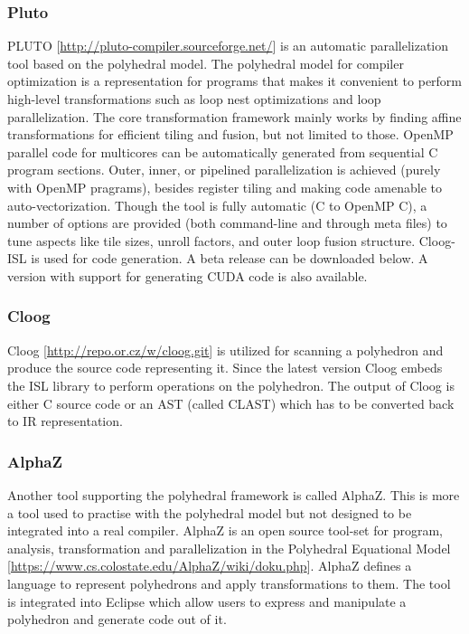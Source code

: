 \subsubsection{Pluto} 
PLUTO [\url{http://pluto-compiler.sourceforge.net/}] is an automatic parallelization tool based on the
polyhedral model. The polyhedral model for compiler optimization is a
representation for programs that makes it convenient to perform high-level
transformations such as loop nest optimizations and loop parallelization. 
The core transformation framework mainly works by
finding affine transformations for efficient tiling and fusion, but not limited
to those. OpenMP parallel code for multicores can be automatically generated
from sequential C program sections. Outer, inner, or pipelined parallelization
is achieved (purely with OpenMP pragrams), besides register tiling and making
code amenable to auto-vectorization. Though the tool is fully automatic (C to
OpenMP C), a number of options are provided (both command-line and
through meta files) to tune aspects like tile sizes, unroll factors,
and outer loop fusion structure. Cloog-ISL is used for code generation.
A beta release can be downloaded below. A version with support for
generating CUDA code is also available.

\subsubsection{Cloog}
Cloog [\url{http://repo.or.cz/w/cloog.git}] is utilized for scanning a
polyhedron and produce the source code representing it. Since the latest version
Cloog embeds the ISL library to perform operations on the polyhedron. The output
of Cloog is either C source code or an AST (called CLAST) which has to be
converted back to IR representation. 


\subsubsection{AlphaZ}
Another tool supporting the polyhedral framework is called AlphaZ. This is more
a tool used to practise with the polyhedral model but not designed to be
integrated into a real compiler. AlphaZ is an open source tool-set for program,
analysis, transformation and parallelization in the Polyhedral
Equational Model [\url{https://www.cs.colostate.edu/AlphaZ/wiki/doku.php}].
AlphaZ defines a language to represent polyhedrons and apply transformations to
them. The tool is integrated into Eclipse which allow users to express and
manipulate a polyhedron and generate code out of it. 




